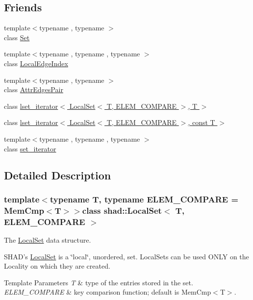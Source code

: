 \subsection*{Friends}
\begin{DoxyCompactItemize}
\item 
{\footnotesize template$<$typename , typename $>$ }\\class \hyperlink{classshad_1_1LocalSet_abe8ae75525fd5b29f58e1b5537b92ba1}{Set}
\item 
{\footnotesize template$<$typename , typename , typename $>$ }\\class \hyperlink{classshad_1_1LocalSet_afc8d107f39c9ea0b8848ea970eb36b93}{Local\-Edge\-Index}
\item 
{\footnotesize template$<$typename , typename $>$ }\\class \hyperlink{classshad_1_1LocalSet_af9dbb4ffd51a4c29389ab2f892cd5e82}{Attr\-Edges\-Pair}
\item 
class \hyperlink{classshad_1_1LocalSet_ac228f5f5ba29b686cbd20956e0fe23bc}{lset\-\_\-iterator$<$ Local\-Set$<$ T, E\-L\-E\-M\-\_\-\-C\-O\-M\-P\-A\-R\-E $>$, T $>$}
\item 
class \hyperlink{classshad_1_1LocalSet_a7fa8272788381da5a3b8cadef548a77f}{lset\-\_\-iterator$<$ Local\-Set$<$ T, E\-L\-E\-M\-\_\-\-C\-O\-M\-P\-A\-R\-E $>$, const T $>$}
\item 
{\footnotesize template$<$typename , typename , typename $>$ }\\class \hyperlink{classshad_1_1LocalSet_a51032913d89093f66aa9219f72afe821}{set\-\_\-iterator}
\end{DoxyCompactItemize}


\subsection{Detailed Description}
\subsubsection*{template$<$typename T, typename E\-L\-E\-M\-\_\-\-C\-O\-M\-P\-A\-R\-E = Mem\-Cmp$<$\-T$>$$>$class shad\-::\-Local\-Set$<$ T, E\-L\-E\-M\-\_\-\-C\-O\-M\-P\-A\-R\-E $>$}

The \hyperlink{classshad_1_1LocalSet}{Local\-Set} data structure. 

S\-H\-A\-D's \hyperlink{classshad_1_1LocalSet}{Local\-Set} is a \char`\"{}local\char`\"{}, unordered, set. Local\-Sets can be used O\-N\-L\-Y on the Locality on which they are created. 
\begin{DoxyTemplParams}{Template Parameters}
{\em T} & type of the entries stored in the set. \\
\hline
{\em E\-L\-E\-M\-\_\-\-C\-O\-M\-P\-A\-R\-E} & key comparison function; default is Mem\-Cmp$<$\-T$>$. \\
\hline
\end{DoxyTemplParams}


